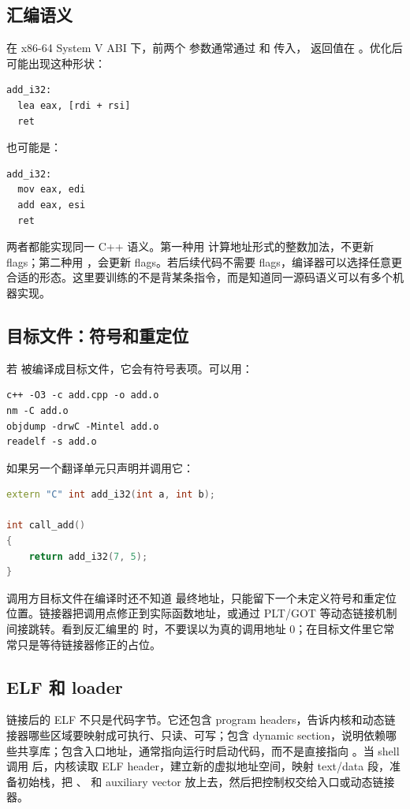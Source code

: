 \subsection{汇编语义}
在 x86-64 System V ABI 下，前两个  参数通常通过  和  传入， 返回值在 。优化后可能出现这种形状：

\begin{lstlisting}[numbers=none,caption={add\_i32 的典型优化汇编形状}]
add_i32:
  lea eax, [rdi + rsi]
  ret
\end{lstlisting}

也可能是：

\begin{lstlisting}[numbers=none,caption={另一种等价形状}]
add_i32:
  mov eax, edi
  add eax, esi
  ret
\end{lstlisting}

两者都能实现同一 C++ 语义。第一种用  计算地址形式的整数加法，不更新 flags；第二种用 ，会更新 flags。若后续代码不需要 flags，编译器可以选择任意更合适的形态。这里要训练的不是背某条指令，而是知道同一源码语义可以有多个机器实现。

\subsection{目标文件：符号和重定位}
若  被编译成目标文件，它会有符号表项。可以用：

\begin{lstlisting}[numbers=none,caption={观察目标文件身份}]
c++ -O3 -c add.cpp -o add.o
nm -C add.o
objdump -drwC -Mintel add.o
readelf -s add.o
\end{lstlisting}

如果另一个翻译单元只声明并调用它：

\begin{lstlisting}[language=C++,caption={调用方翻译单元}]
extern "C" int add_i32(int a, int b);

int call_add()
{
    return add_i32(7, 5);
}
\end{lstlisting}

调用方目标文件在编译时还不知道  最终地址，只能留下一个未定义符号和重定位位置。链接器把调用点修正到实际函数地址，或通过 PLT/GOT 等动态链接机制间接跳转。看到反汇编里的  时，不要误以为真的调用地址 0；在目标文件里它常常只是等待链接器修正的占位。

\subsection{ELF 和 loader}
链接后的 ELF 不只是代码字节。它还包含 program headers，告诉内核和动态链接器哪些区域要映射成可执行、只读、可写；包含 dynamic section，说明依赖哪些共享库；包含入口地址，通常指向运行时启动代码，而不是直接指向 。当 shell 调用  后，内核读取 ELF header，建立新的虚拟地址空间，映射 text/data 段，准备初始栈，把 、 和 auxiliary vector 放上去，然后把控制权交给入口或动态链接器。

